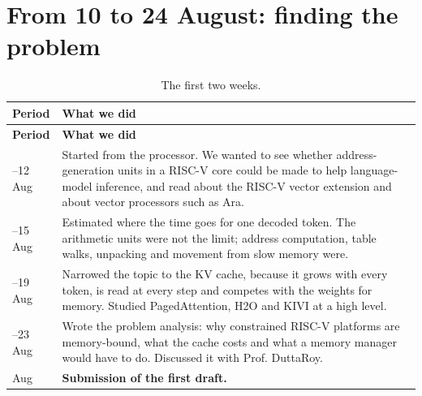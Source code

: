 \documentclass[12pt,a4paper]{report}
\begin{document}
\section{From 10 to 24 August: finding the problem}
{\fontsize{9}{10.5}\selectfont\setlength{\tabcolsep}{3pt}
\begin{longtable}{>{\raggedright\arraybackslash}p{0.95in}>{\raggedright\arraybackslash}p{5.11in}}
\caption{The first two weeks.}\\
\toprule
\textbf{Period} & \textbf{What we did} \\\midrule\endfirsthead
\toprule \textbf{Period} & \textbf{What we did} \\\midrule\endhead
\bottomrule\endfoot
10–12 Aug & Started from the processor. We wanted to see whether address-generation units in a RISC-V core could be made to help language-model inference, and read about the RISC-V vector extension and about vector processors such as Ara. \\
13–15 Aug & Estimated where the time goes for one decoded token. The arithmetic units were not the limit; address computation, table walks, unpacking and movement from slow memory were. \\
16–19 Aug & Narrowed the topic to the KV cache, because it grows with every token, is read at every step and competes with the weights for memory. Studied PagedAttention, H2O and KIVI at a high level. \\
20–23 Aug & Wrote the problem analysis: why constrained RISC-V platforms are memory-bound, what the cache costs and what a memory manager would have to do. Discussed it with Prof. DuttaRoy. \\
24 Aug & \textbf{Submission of the first draft.} \\
\bottomrule
\end{longtable}}
\end{document}
